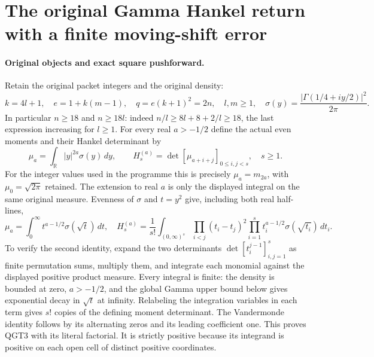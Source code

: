 \section{The original Gamma Hankel return with a finite moving-shift error}
\label{sec:QGT}

\paragraph{Original objects and exact square pushforward.}
Retain the original packet integers and the original density:
\[
 k=4l+1,\quad e=1+k(m-1),\quad q=e(k+1)^2=2n,
 \quad l,m\ge1,\quad
 \sigma(y)=\frac{|\Gamma(1/4+iy/2)|^2}{2\pi}.
 \tag{QGT1}
\]
In particular $n\ge18$ and $n\ge18l$: indeed
$n/l\ge8l+8+2/l\ge18$, the last expression increasing for $l\ge1$.
For every real $a>-1/2$ define the actual even moments and their
Hankel determinant by
\[
 \mu_a=\int_{\mathbb R}|y|^{2a}\sigma(y)\,dy,
 \qquad H_s^{(a)}=\det[\mu_{a+i+j}]_{0\le i,j<s},\quad s\ge1.
 \tag{QGT2}
\]
For the integer values used in the programme this is precisely
$\mu_a=m_{2a}$, with $\mu_0=\sqrt{2\pi}$ retained. The extension to
real $a$ is only the displayed integral on the same original measure.
Evenness of $\sigma$ and $t=y^2$ give, including both real half-lines,
\[
 \mu_a=\int_0^\infty t^{a-1/2}\sigma(\sqrt t)\,dt,
 \quad
 H_s^{(a)}=\frac1{s!}\int_{(0,\infty)^s}
       \prod_{i<j}(t_i-t_j)^2
       \prod_{i=1}^s t_i^{a-1/2}\sigma(\sqrt{t_i})\,dt_i.
 \tag{QGT3}
\]
To verify the second identity, expand the two determinants
$\det[t_i^{j-1}]_{i,j=1}^s$ as finite permutation sums, multiply them,
and integrate each monomial against the displayed positive product
measure. Every integral is finite: the density is bounded at zero,
$a>-1/2$, and the global Gamma upper bound below gives exponential
decay in $\sqrt t$ at infinity. Relabeling the integration variables
in each term gives $s!$ copies of the defining moment determinant.
The Vandermonde identity follows by its alternating zeros and its
leading coefficient one. This proves QGT3 with its literal factorial.
It is strictly positive because its integrand is positive on each
open cell of distinct positive coordinates.

